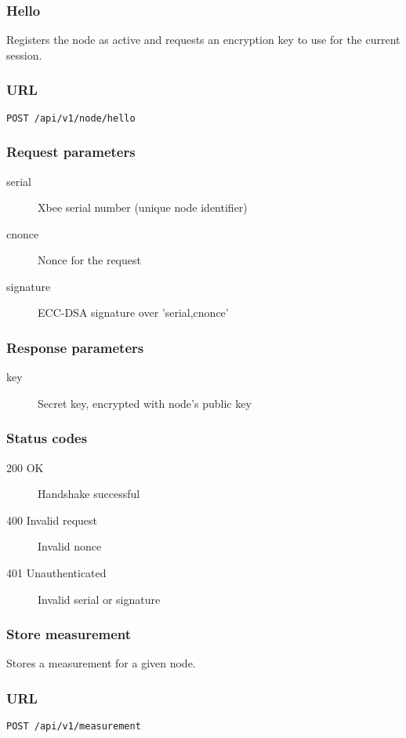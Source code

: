 \documentclass[]{scrreprt}
\begin{document}
\subsubsection{Hello}
Registers the node as active and requests an encryption key to use for the current session.

\subsubsection*{URL}
\texttt{POST /api/v1/node/hello}

\subsubsection*{Request parameters}
\begin{description}
\item[serial] Xbee serial number (unique node identifier)
\item[cnonce] Nonce for the request
\item[signature] ECC-DSA signature over 'serial,cnonce'
\end{description}

\subsubsection*{Response parameters}
\begin{description}
\item[key] Secret key, encrypted with node's public key
\end{description}

\subsubsection*{Status codes}
\begin{description}
\item[200 OK] Handshake successful
\item[400 Invalid request] Invalid nonce
\item[401 Unauthenticated] Invalid serial or signature
\end{description}

\subsubsection{Store measurement}
Stores a measurement for a given node.

\subsubsection*{URL}
\texttt{POST /api/v1/measurement}
\end{document}

